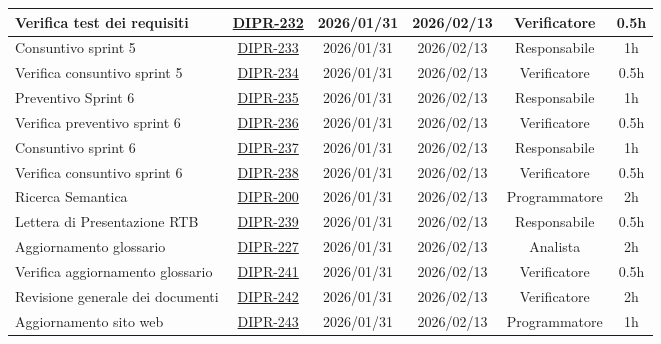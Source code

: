 \documentclass[a4paper,12pt]{article}
\begin{document}
\begin{table}[H]
\begin{adjustwidth}{-4cm}{-4cm}
\begin{spacing}{1}
\begin{tabular}{|p{4cm}|c|c|c|c|c|}
        \hline
        Verifica test dei requisiti & \href{https://7zpus.atlassian.net/browse/DIPR-232}{DIPR-232} & 2026/01/31 & 2026/02/13 & Verificatore & 0.5h \\
        \hline
        Consuntivo sprint 5 & \href{https://7zpus.atlassian.net/browse/DIPR-233}{DIPR-233} & 2026/01/31 & 2026/02/13 & Responsabile & 1h \\
        \hline
        Verifica consuntivo sprint 5 & \href{https://7zpus.atlassian.net/browse/DIPR-234}{DIPR-234} & 2026/01/31 & 2026/02/13 & Verificatore & 0.5h \\
        \hline
        Preventivo Sprint 6 & \href{https://7zpus.atlassian.net/browse/DIPR-235}{DIPR-235} & 2026/01/31 & 2026/02/13 & Responsabile & 1h \\
        \hline
        Verifica preventivo sprint 6 & \href{https://7zpus.atlassian.net/browse/DIPR-236}{DIPR-236} & 2026/01/31 & 2026/02/13 & Verificatore & 0.5h \\
        \hline
        Consuntivo sprint 6 & \href{https://7zpus.atlassian.net/browse/DIPR-237}{DIPR-237} & 2026/01/31 & 2026/02/13 & Responsabile & 1h \\
        \hline
        Verifica consuntivo sprint 6 & \href{https://7zpus.atlassian.net/browse/DIPR-238}{DIPR-238} & 2026/01/31 & 2026/02/13 & Verificatore & 0.5h \\
        \hline
        Ricerca Semantica & \href{https://7zpus.atlassian.net/browse/DIPR-200}{DIPR-200} & 2026/01/31 & 2026/02/13 & Programmatore & 2h \\
        \hline
        Lettera di Presentazione RTB & \href{https://7zpus.atlassian.net/browse/DIPR-239}{DIPR-239} & 2026/01/31 & 2026/02/13 & Responsabile & 0.5h \\
        \hline
        Aggiornamento glossario & \href{https://7zpus.atlassian.net/browse/DIPR-227}{DIPR-227} & 2026/01/31 & 2026/02/13 & Analista & 2h \\
        \hline
        Verifica aggiornamento glossario & \href{https://7zpus.atlassian.net/browse/DIPR-241}{DIPR-241} & 2026/01/31 & 2026/02/13 & Verificatore & 0.5h \\
        \hline
        Revisione generale dei documenti & \href{https://7zpus.atlassian.net/browse/DIPR-242}{DIPR-242} & 2026/01/31 & 2026/02/13 & Verificatore & 2h \\
        \hline
        Aggiornamento sito web & \href{https://7zpus.atlassian.net/browse/DIPR-243}{DIPR-243} & 2026/01/31 & 2026/02/13 & Programmatore & 1h \\

\end{tabular}
\end{spacing}
\end{adjustwidth}
\end{table}
\end{document}
